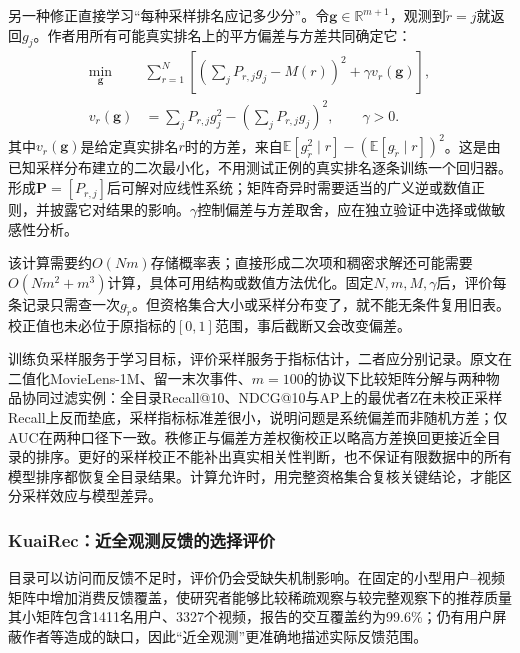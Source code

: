 另一种修正直接学习“每种采样排名应记多少分”。令$\bm g\in\mathbb R^{m+1}$，观测到$\widetilde r=j$就返回$g_j$。作者用所有可能真实排名上的平方偏差与方差共同确定它：
\begin{equation}
  \begin{aligned}
    \min_{\bm g}\quad&
      \sum_{r=1}^{N}
      \left[\left(\sum_jP_{r,j}g_j-M(r)\right)^2
        +\gamma v_r(\bm g)\right],\\
    v_r(\bm g)&=\sum_jP_{r,j}g_j^2-
       \left(\sum_jP_{r,j}g_j\right)^2,\qquad\gamma>0.
  \end{aligned}
  \label{eq:rs-evaluation-metric-correction}
\end{equation}
其中$v_r(\bm g)$是给定真实排名$r$时的方差，来自$\mathbb E[g_{\widetilde r}^2\mid r]-(\mathbb E[g_{\widetilde r}\mid r])^2$。这是由已知采样分布建立的二次最小化，不用测试正例的真实排名逐条训练一个回归器。形成$\bm P=[P_{r,j}]$后可解对应线性系统；矩阵奇异时需要适当的广义逆或数值正则，并披露它对结果的影响。$\gamma$控制偏差与方差取舍，应在独立验证中选择或做敏感性分析。

该计算需要约$O(Nm)$存储概率表；直接形成二次项和稠密求解还可能需要$O(Nm^2+m^3)$计算，具体可用结构或数值方法优化。固定$N,m,M,\gamma$后，评价每条记录只需查一次$g_{\widetilde r}$。但资格集合大小或采样分布变了，就不能无条件复用旧表。校正值也未必位于原指标的$[0,1]$范围，事后截断又会改变偏差。

训练负采样服务于学习目标，评价采样服务于指标估计，二者应分别记录。原文在二值化MovieLens-1M、留一末次事件、$m=100$的协议下比较矩阵分解与两种物品协同过滤实例：全目录Recall@10、NDCG@10与AP上的最优者Z在未校正采样Recall上反而垫底，采样指标标准差很小，说明问题是系统偏差而非随机方差；仅AUC在两种口径下一致。秩修正与偏差方差权衡校正以略高方差换回更接近全目录的排序。更好的采样校正不能补出真实相关性判断，也不保证有限数据中的所有模型排序都恢复全目录结果。计算允许时，用完整资格集合复核关键结论，才能区分采样效应与模型差异。

\Needspace{95mm}
\subsubsection{KuaiRec：近全观测反馈的选择评价}
\label{sec:rs-evaluation-kuairec}

目录可以访问而反馈不足时，评价仍会受缺失机制影响。在固定的小型用户--视频矩阵中增加消费反馈覆盖，使研究者能够比较稀疏观察与较完整观察下的推荐质量其小矩阵包含1411名用户、3327个视频，报告的交互覆盖约为99.6\%；仍有用户屏蔽作者等造成的缺口，因此“近全观测”更准确地描述实际反馈范围。

